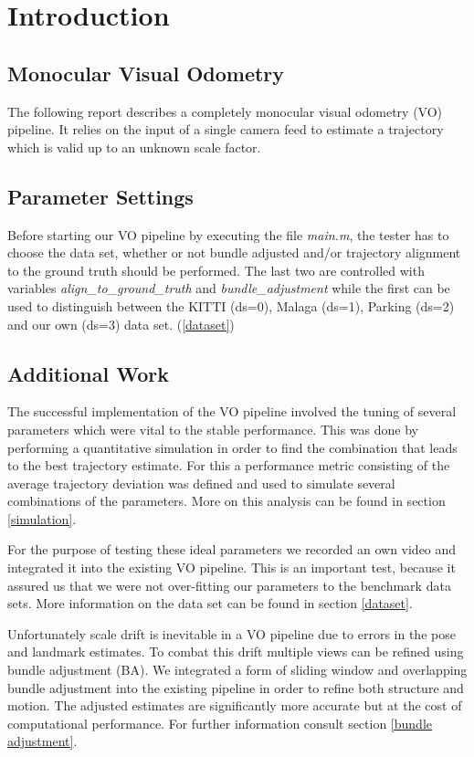 \chapter{Introduction}
\vspace{-10mm}
\section{Monocular Visual Odometry}
The following report describes a completely monocular visual odometry (VO) pipeline. It relies on the input of a single camera feed to estimate a trajectory which is valid up to an unknown scale factor.

\section{Parameter Settings}
\label{params}
Before starting our VO pipeline by executing the file \emph{main.m}, the tester has to choose the data set, whether or not bundle adjusted and/or trajectory alignment to the ground truth should be performed. The last two are controlled with variables \emph{align\_to\_ground\_truth} and \emph{bundle\_adjustment} while the first can be used to distinguish between the KITTI (ds=0), Malaga (ds=1), Parking (ds=2) and our own (ds=3) data set. (\ref{dataset})

\section{Additional Work}
The successful implementation of the VO pipeline involved the tuning of several parameters which were vital to the stable performance. This was done by performing a quantitative simulation in order to find the combination that leads to the best trajectory estimate. For this a performance metric consisting of the average trajectory deviation was defined and used to simulate several combinations of the parameters. More on this analysis can be found in section \ref{simulation}. \par
For the purpose of testing these ideal parameters we recorded an own video and integrated it into the existing VO pipeline. This is an important test, because it assured us that we were not over-fitting our parameters to the benchmark data sets. More information on the data set can be found in section \ref{dataset}. \par
Unfortunately scale drift is inevitable in a VO pipeline due to errors in the pose and landmark estimates. To combat this drift multiple views can be refined using bundle adjustment (BA). We integrated a form of sliding window and overlapping bundle adjustment into the existing pipeline in order to refine both structure and motion. The adjusted estimates are significantly more accurate but at the cost of computational performance. For further information consult section \ref{bundle adjustment}.

